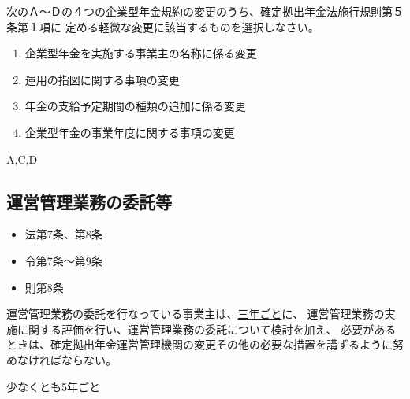 \begin{truefalse}[年金1 H29 問題1(4)\textcircled{5}]
  次のＡ～Ｄの４つの企業型年金規約の変更のうち、確定拠出年金法施行規則第５条第１項に
定める軽微な変更に該当するものを選択しなさい。
\begin{enumerate}[A:]
  \item 企業型年金を実施する事業主の名称に係る変更
  \item 運用の指図に関する事項の変更
  \item 年金の支給予定期間の種類の追加に係る変更
  \item 企業型年金の事業年度に関する事項の変更
\end{enumerate}
\end{truefalse}

\begin{answerbox}
  A,C,D
\end{answerbox}

\newpage

\subsection{運営管理業務の委託等}

\begin{InyouJobunbox}
  \begin{itemize}
    \item 法第7条、第8条
    \item 令第7条〜第9条
    \item 則第8条
  \end{itemize}
\end{InyouJobunbox}

\begin{truefalse}[自作 2026/10/17]
  
  運営管理業務の委託を行なっている事業主は、\underline{三年ごと}に、
  運営管理業務の実施に関する評価を行い、運営管理業務の委託について検討を加え、
  必要があるときは、確定拠出年金運営管理機関の変更その他の必要な措置を講ずるように努めなければならない。

\end{truefalse}

\begin{answerbox}
  少なくとも5年ごと
\end{answerbox}

\newpage